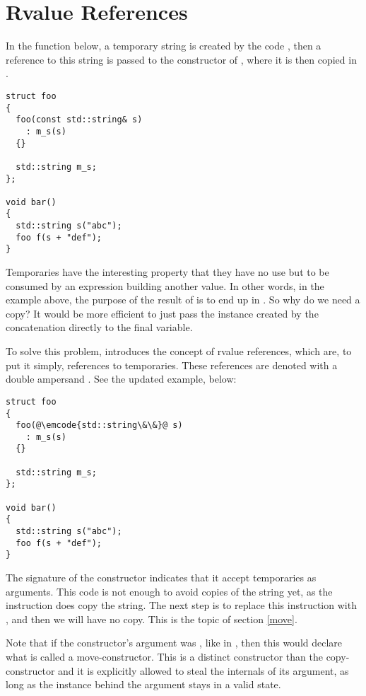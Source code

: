 \section{Rvalue References}

In the function  below, a temporary string is created by
the code , then a reference to this string is passed
to the constructor of , where it is then copied in
.

\begin{lstlisting}
struct foo
{
  foo(const std::string& s)
    : m_s(s)
  {}

  std::string m_s;
};

void bar()
{
  std::string s("abc");
  foo f(s + "def");
}
\end{lstlisting}

Temporaries have the interesting property that they have no use but to
be consumed by an expression building another value. In other words,
in the example above, the purpose of the result of  is
to end up in . So why do we need a copy? It would be
more efficient to just pass the instance created by the concatenation
directly to the final variable.

To solve this problem,  introduces the concept of rvalue
references, which are, to put it simply, references to
temporaries. These references are denoted with a double ampersand
\code{\&\&}. See the updated example, below:

\begin{lstlisting}
struct foo
{
  foo(@\emcode{std::string\&\&}@ s)
    : m_s(s)
  {}

  std::string m_s;
};

void bar()
{
  std::string s("abc");
  foo f(s + "def");
}
\end{lstlisting}

The signature of the constructor indicates that it accept temporaries
as arguments. This code is not enough to avoid copies of the string
yet, as the instruction  does copy the string. The next
step is to replace this instruction with ,
and then we will have no copy. This is the topic of section
\ref{move}.

Note that if the constructor's argument was , like in
, then this would declare what is called a
move-constructor. This is a distinct constructor than the
copy-constructor and it is explicitly allowed to steal the internals
of its argument, as long as the instance behind the argument stays in
a valid state.

